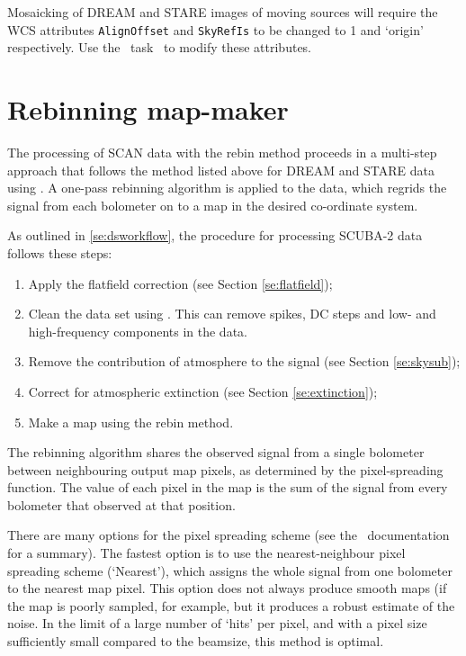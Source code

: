 \documentclass[oneside,11pt]{starlink}
\begin{document}
Mosaicking of DREAM and STARE images of moving sources will require the WCS
attributes \verb+AlignOffset+ and \verb+SkyRefIs+ to be changed to 1
and `origin' respectively. Use the \KAPPA\ task \wcsattrib\ to
modify these attributes.


\section{Rebinning map-maker\label{se:rebin}}

The processing of SCAN data with the rebin method proceeds in a
multi-step approach that follows the method listed above for DREAM and
STARE data using \makemap. A one-pass rebinning algorithm is applied
to the data, which regrids the signal from each bolometer on to a map
in the desired co-ordinate system.

As outlined in \ref{se:dsworkflow}, the procedure for processing
SCUBA-2 data follows these steps:
\begin{enumerate}
\item Apply the flatfield correction (see Section \ref{se:flatfield});
\item Clean the data set using \clean. This can remove spikes, DC
  steps and low- and high-frequency components in the data.
\item Remove the contribution of atmosphere to the signal (see Section
  \ref{se:skysub});
\item Correct for atmospheric extinction (see Section
  \ref{se:extinction});
\item Make a map using the rebin method.
\end{enumerate}

The rebinning algorithm shares the observed signal from a single
bolometer between neighbouring output map pixels, as determined by the
pixel-spreading function. The value of each pixel in the map is the
sum of the signal from every bolometer that observed at that position.

There are many options for the pixel spreading scheme (see the \wcsmosaic\
documentation for a summary). The fastest option is to use the nearest-neighbour
pixel spreading scheme (`Nearest'), which assigns the whole signal
from one bolometer to the nearest map pixel. This option does not
always produce smooth maps (if the map is poorly sampled, for example,
but it produces a robust estimate of the noise. In the limit of a
large number of `hits' per pixel, and with a pixel size sufficiently
small compared to the beamsize, this method is optimal.
\end{document}
